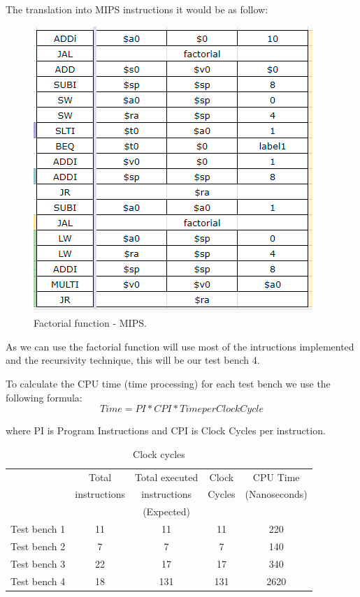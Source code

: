 \documentclass[conference]{IEEEtran}
\begin{document}
The translation into MIPS instructions it would be as follow:
\begin{figure}[h]
\begin{center}
\includegraphics[scale=0.55]{factorial_mips.png}
\caption{Factorial function - MIPS.}
\label{fact_mips}
\end{center}
\end{figure}
 
As we can use the factorial function will use most of the intructions implemented and the recursivity
technique, this will be our test bench 4.

To calculate the CPU time \cite{b5} (time processing) for each test bench we use the following formula:
\[Time = PI * CPI * Time per Clock Cycle\] 

where PI is Program Instructions and CPI is Clock Cycles per instruction. 

\begin{table}[h]
\caption{Clock cycles} %
\begin{center}
\begin{tabular}{|c|c|c|c|c|}
\hline
&Total&Total executed&Clock&CPU Time\\
&instructions&instructions&Cycles&(Nanoseconds)\\
&&(Expected)&&\\
\hline
Test bench 1&11&11&11&220\\
\hline
Test bench 2&7&7&7&140\\
\hline
Test bench 3&22&17&17&340\\
\hline
Test bench 4&18&131&131&2620\\
\hline
\end{tabular}
\label{tab_test3}
\end{center}
\end{table}
\end{document}
